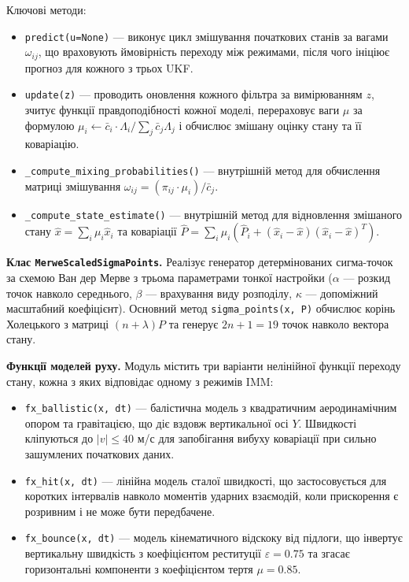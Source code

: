 Ключові методи:
\begin{itemize}
    \item \texttt{predict(u=None)} --- виконує цикл змішування початкових станів за
    вагами $\omega_{ij}$, що враховують ймовірність переходу між режимами, після
    чого ініціює прогноз для кожного з трьох \gls{UKF}.
    \item \texttt{update(z)} --- проводить оновлення кожного фільтра за вимірюванням
    $z$, зчитує функції правдоподібності кожної моделі, перераховує ваги $\mu$ за
    формулою $\mu_i \leftarrow \bar{c}_i \cdot \Lambda_i / \sum_j \bar{c}_j \Lambda_j$
    і обчислює змішану оцінку стану та її коваріацію.
    \item \texttt{\_compute\_mixing\_probabilities()} --- внутрішній метод для
    обчислення матриці змішування $\omega_{ij} = (\pi_{ij} \cdot \mu_i) / \bar{c}_j$.
    \item \texttt{\_compute\_state\_estimate()} --- внутрішній метод для відновлення
    змішаного стану $\hat{x} = \sum_i \mu_i \hat{x}_i$ та коваріації
    $\hat{P} = \sum_i \mu_i (\hat{P}_i + (\hat{x}_i - \hat{x})(\hat{x}_i - \hat{x})^T)$.
\end{itemize}

\textbf{Клас \texttt{MerweScaledSigmaPoints}.} Реалізує генератор детермінованих
сигма-точок за схемою Ван дер Мерве з трьома параметрами тонкої настройки
($\alpha$ --- розкид точок навколо середнього, $\beta$ --- врахування виду розподілу,
$\kappa$ --- допоміжний масштабний коефіцієнт). Основний метод
\texttt{sigma\_points(x, P)} обчислює корінь Холецького з матриці $(n + \lambda) P$
та генерує $2n + 1 = 19$ точок навколо вектора стану.

\textbf{Функції моделей руху.} Модуль містить три варіанти нелінійної функції
переходу стану, кожна з яких відповідає одному з режимів \gls{IMM}:
\begin{itemize}
    \item \texttt{fx\_ballistic(x, dt)} --- балістична модель з квадратичним
    аеродинамічним опором та гравітацією, що діє вздовж вертикальної осі $Y$.
    Швидкості кліпуються до $|v| \leq 40$ м/с для запобігання вибуху коваріації
    при сильно зашумлених початкових даних.
    \item \texttt{fx\_hit(x, dt)} --- лінійна модель сталої швидкості, що
    застосовується для коротких інтервалів навколо моментів ударних взаємодій,
    коли прискорення є розривним і не може бути передбачене.
    \item \texttt{fx\_bounce(x, dt)} --- модель кінематичного відскоку від
    підлоги, що інвертує вертикальну швидкість з коефіцієнтом реституції
    $\varepsilon = 0.75$ та згасає горизонтальні компоненти з коефіцієнтом
    тертя $\mu = 0.85$.
\end{itemize}

